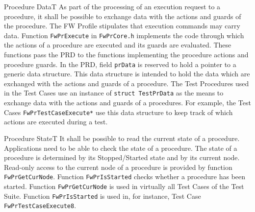 \documentclass[a4paper,10pt]{article}
\newenvironment{fw_req}[6]
{\addtocounter{subsubsection}{1}
	\hspace{0.2cm}\textbf{FW-\arabic{section}.\arabic{subsection}.\arabic{subsubsection}/#2
	\hspace{0.8cm} #1}
	\vspace{-10pt}
\begin{longtable}{p{2.7cm}P{8.5cm}}
\hline
\textsc{Requirement} & #3 \\
\textsc{Justification} & #4 \\
\textsc{Implementation} & #5  \\ 
\textsc{Verification} & #6  \\
\hline
}
{\end{longtable}}
\begin{document}
\begin{fw_req}{Procedure Data}{T}
{As part of the processing of an execution request to a procedure, 
it shall be possible to exchange data with the actions and guards of the procedure.}
{The FW Profile stipulates that execution commands may carry data.}
{Function \texttt{FwPrExecute} in \texttt{FwPrCore.h} implements the 
code through which the actions of a procedure are executed and its guards are evaluated. 
These functions pass the PRD to the functions implementing the procedure actions and procedure 
guards. 
In the PRD, field \texttt{prData} is reserved to hold a pointer to a generic data structure. 
This data structure is intended to hold the data which are exchanged with the actions and guards 
of a procedure.} 
{The Test Procedures used in the Test Cases use an instance of 
\texttt{struct TestPrData} as the means to exchange data with the actions and guards of a 
procedures. 
For example, the Test Cases \texttt{FwPrTestCaseExecute*} use this data structure to keep 
track of which actions are executed during a test.}
\end{fw_req}


\begin{fw_req}{Procedure State}{T}
{It shall be possible to read the current state of a procedure.}
{Applications need to be able to check the state of a procedure.}
{The state of a procedure is determined by its Stopped/Started state and 
by its current node.
Read-only access to the current node of a procedure is provided by function 
\texttt{FwPrGetCurNode}. 
Function \texttt{FwPrIsStarted} checks whether a procedure has been started.} 
{Function \texttt{FwPrGetCurNode} is used in virtually all Test Cases of 
the Test Suite. 
Function \texttt{FwPrIsStarted} is used in, for instance, Test Case \texttt{FwPrTestCaseExecute8}.}
\end{fw_req}
\end{document}
